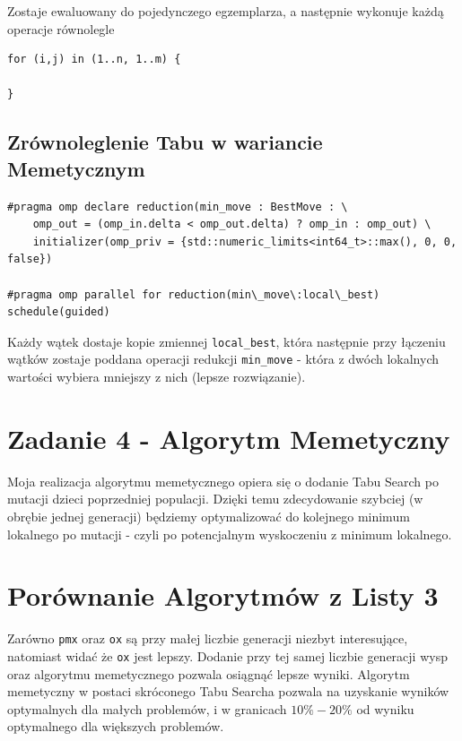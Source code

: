 \documentclass{article}
\begin{document}
Zostaje ewaluowany do pojedynczego egzemplarza, a następnie wykonuje każdą operacje równolegle

\begin{verbatim}
for (i,j) in (1..n, 1..m) {

}
\end{verbatim}

\subsection{Zrównoleglenie Tabu w wariancie Memetycznym}

\begin{verbatim}
#pragma omp declare reduction(min_move : BestMove : \
    omp_out = (omp_in.delta < omp_out.delta) ? omp_in : omp_out) \
    initializer(omp_priv = {std::numeric_limits<int64_t>::max(), 0, 0, false})

#pragma omp parallel for reduction(min\_move\:local\_best) schedule(guided)
\end{verbatim}

Każdy wątek dostaje kopie zmiennej \texttt{local\_best}, która następnie przy łączeniu wątków
zostaje poddana operacji redukcji \texttt{min\_move} - która z dwóch lokalnych wartości wybiera mniejszy z nich (lepsze rozwiązanie). 

\section{Zadanie 4 - Algorytm Memetyczny}

Moja realizacja algorytmu memetycznego opiera się o dodanie Tabu Search po mutacji dzieci poprzedniej populacji.
Dzięki temu zdecydowanie szybciej (w obrębie jednej generacji) będziemy optymalizować
do kolejnego minimum lokalnego po mutacji - czyli po potencjalnym wyskoczeniu z minimum lokalnego.

\section{Porównanie Algorytmów z Listy 3}





Zarówno \texttt{pmx} oraz \texttt{ox} są przy małej liczbie generacji niezbyt interesujące, natomiast widać że \texttt{ox} jest lepszy.
Dodanie przy tej samej liczbie generacji wysp oraz algorytmu memetycznego pozwala osiągnąć lepsze wyniki.
Algorytm memetyczny w postaci skróconego Tabu Searcha pozwala na uzyskanie wyników optymalnych dla małych problemów,
i w granicach $10\%-20\%$ od wyniku optymalnego dla większych problemów.
\end{document}
